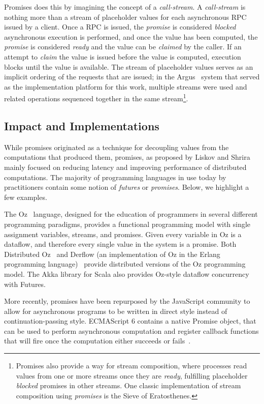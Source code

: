 Promises does this by imagining the concept of a \textit{call-stream}.  A \textit{call-stream} is nothing more than a stream of placeholder values for each asynchronous RPC issued by a client.  Once a RPC is issued, the \textit{promise} is considered \textit{blocked} asynchronous execution is performed, and once the value has been computed, the \textit{promise} is considered \textit{ready} and the value can be \textit{claimed} by the caller.  If an attempt to \textit{claim} the value is issued before the value is computed, execution blocks until the value is available.  The stream of placeholder values serves as an implicit ordering of the requests that are issued; in the Argus~\cite{liskov1988distributed} system that served as the implementation platform for this work, multiple streams were used and related operations sequenced together in the same stream\footnote{Promises also provide a way for stream composition, where processes read values from one or more streams once they are \textit{ready}, fulfilling placeholder \textit{blocked} promises in other streams.  One classic implementation of stream composition using \textit{promises} is the Sieve of Eratosthenes.}.

\subsection{Impact and Implementations}

While promises originated as a technique for decoupling values from the computations that produced them, promises, as proposed by Liskov and Shrira mainly focused on reducing latency and improving performance of distributed computations.  The majority of programming languages in use today by practitioners contain some notion of \textit{futures} or \textit{promises}.  Below, we highlight a few examples.

The Oz~\cite{henz1993oz} language, designed for the education of programmers in several different programming paradigms, provides a functional programming model with single assignment variables, streams, and promises.  Given every variable in Oz is a dataflow, and therefore every single value in the system is a promise.  Both Distributed Oz~\cite{haridi1997overview} and Derflow (an implementation of Oz in the Erlang programming language)~\cite{Bravo:2014:DDD:2633448.2633451} provide distributed versions of the Oz programming model.  The Akka library for Scala also provides Oz-style dataflow concurrency with Futures.

More recently, promises have been repurposed by the JavaScript community to allow for asynchronous programs to be written in direct style instead of continuation-passing style.  ECMAScript 6 contains a native Promise object, that can be used to perform asynchronous computation and register callback functions that will fire once the computation either succeeds or fails~\cite{wiki:futures}.